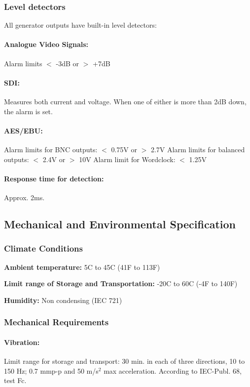 \subsubsection{Level detectors}
All generator outputs have built-in level detectors:

\paragraph{Analogue Video Signals:}
Alarm limits $<$ -3dB or $>$ +7dB

\paragraph{SDI:}
Measures both current and voltage. When one of either is more than 2dB down, the alarm is set.

\paragraph{AES/EBU:}
Alarm limits for BNC outputs: $<$ 0.75V or $>$ 2.7V
Alarm limits for balanced outputs: $<$ 2.4V or $>$ 10V
Alarm limit for Wordclock: $<$ 1.25V

\paragraph{Response time for detection:}
Approx. 2ms.

\subsection{Mechanical and Environmental Specification}
\subsubsection{Climate Conditions}
\textbf{Ambient temperature:} 5\degrees C to 45\degrees C (41\degrees F to 113\degrees F)

\textbf{Limit range of Storage and Transportation:} -20\degrees C to 60\degrees C (-4\degrees F to 140\degrees F)

\textbf{Humidity:} Non condensing (IEC 721)

\subsubsection{Mechanical Requirements}
\paragraph{Vibration:}
Limit range for storage and transport:
30 min. in each of three directions, 10 to 150 Hz; 0.7 mmp-p and 50 m/s$^2$
max acceleration.
According to IEC-Publ. 68, test Fc.

